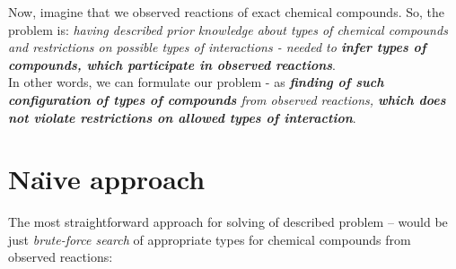 \documentclass[10pt]{article}
\begin{document}
\begin{tcolorbox}[colback=gray!5,colframe=gray!70,title=Example of compound and reaction types,left=7pt, right=7pt]
\end{tcolorbox}

Now, imagine that we observed reactions of exact chemical compounds.
So, the problem is: \textsl{having described prior knowledge about types of chemical compounds and restrictions on possible types of interactions - needed to \textbf{infer types of compounds, which participate in observed reactions}}. \\

In other words, we can formulate our problem - as \textsl{\textbf{finding of such configuration of types of compounds} from observed reactions, \textbf{which does not violate restrictions on allowed types of interaction}}.

\newpage

\section{Na\"{\i}ve approach}
The most straightforward approach for solving of described problem -- would be just \emph{brute-force search} of appropriate types for chemical compounds from observed reactions:
\end{document}
